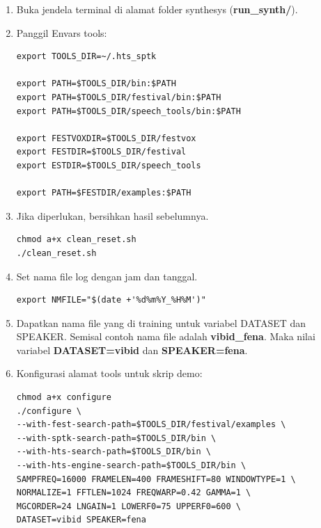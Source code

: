 \documentclass[12pt,]{article}
\begin{document}
	\begin{enumerate}
		\item Buka jendela terminal di alamat folder synthesys (\textbf{run\_synth/}).
		
		\item Panggil Envars tools:
		\begin{verbatim}
export TOOLS_DIR=~/.hts_sptk

export PATH=$TOOLS_DIR/bin:$PATH
export PATH=$TOOLS_DIR/festival/bin:$PATH
export PATH=$TOOLS_DIR/speech_tools/bin:$PATH

export FESTVOXDIR=$TOOLS_DIR/festvox
export FESTDIR=$TOOLS_DIR/festival
export ESTDIR=$TOOLS_DIR/speech_tools

export PATH=$FESTDIR/examples:$PATH
		\end{verbatim}

		\item Jika diperlukan, bersihkan hasil sebelumnya.
		\begin{verbatim}
chmod a+x clean_reset.sh
./clean_reset.sh
		\end{verbatim}
		
		\item Set nama file log dengan jam dan tanggal.
		\begin{verbatim}
export NMFILE="$(date +'%d%m%Y_%H%M')"
		\end{verbatim}
		
		\item Dapatkan nama file yang di training untuk variabel DATASET dan SPEAKER.
		Semisal contoh nama file adalah \textbf{vibid\_fena}.
		Maka nilai variabel \textbf{DATASET=vibid} dan \textbf{SPEAKER=fena}.
		
		\item Konfigurasi alamat tools untuk skrip demo:
		\begin{verbatim}
chmod a+x configure
./configure \
--with-fest-search-path=$TOOLS_DIR/festival/examples \
--with-sptk-search-path=$TOOLS_DIR/bin \
--with-hts-search-path=$TOOLS_DIR/bin \
--with-hts-engine-search-path=$TOOLS_DIR/bin \
SAMPFREQ=16000 FRAMELEN=400 FRAMESHIFT=80 WINDOWTYPE=1 \
NORMALIZE=1 FFTLEN=1024 FREQWARP=0.42 GAMMA=1 \
MGCORDER=24 LNGAIN=1 LOWERF0=75 UPPERF0=600 \
DATASET=vibid SPEAKER=fena
		\end{verbatim}
		

\end{enumerate}
\end{document}
